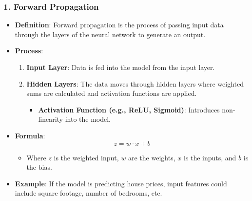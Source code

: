 \documentclass[aspectratio=169]{beamer}
\begin{document}
\begin{frame}[fragile]
    \frametitle{1. Forward Propagation}

    \begin{itemize}
        \item \textbf{Definition}: Forward propagation is the process of passing input data through the layers of the neural network to generate an output.
        
        \item \textbf{Process}:
        \begin{enumerate}
            \item \textbf{Input Layer}: Data is fed into the model from the input layer.
            \item \textbf{Hidden Layers}: The data moves through hidden layers where weighted sums are calculated and activation functions are applied.
            \begin{itemize}
                \item \textbf{Activation Function (e.g., ReLU, Sigmoid)}: Introduces non-linearity into the model.
            \end{itemize}
        \end{enumerate}
        
        \item \textbf{Formula}:
        \begin{equation}
        z = w \cdot x + b
        \end{equation}
        \begin{itemize}
            \item Where \( z \) is the weighted input, \( w \) are the weights, \( x \) is the inputs, and \( b \) is the bias.
        \end{itemize}

        \item \textbf{Example}: If the model is predicting house prices, input features could include square footage, number of bedrooms, etc.
    \end{itemize}
\end{frame}
\end{document}
